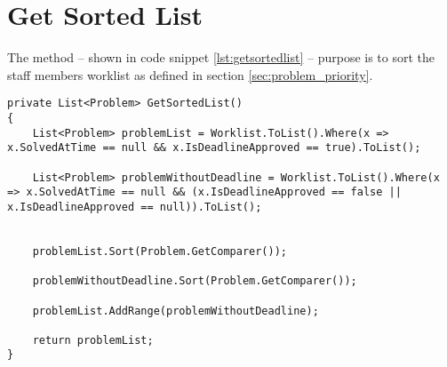 \section{Get Sorted List}
\label{sec:getsortedlist}



The  method -- shown in code snippet \ref{lst:getsortedlist} -- purpose is to sort the staff members worklist as defined in section \ref{sec:problem_priority}. 


\begin{lstlisting}[style=sourceCode, caption=\myCaption{The GetSortedList method}, label=lst:getsortedlist,float=h]
private List<Problem> GetSortedList()
{
    List<Problem> problemList = Worklist.ToList().Where(x => x.SolvedAtTime == null && x.IsDeadlineApproved == true).ToList();

    List<Problem> problemWithoutDeadline = Worklist.ToList().Where(x => x.SolvedAtTime == null && (x.IsDeadlineApproved == false || x.IsDeadlineApproved == null)).ToList();


    problemList.Sort(Problem.GetComparer());

    problemWithoutDeadline.Sort(Problem.GetComparer());

    problemList.AddRange(problemWithoutDeadline);

    return problemList;
}
\end{lstlisting}
